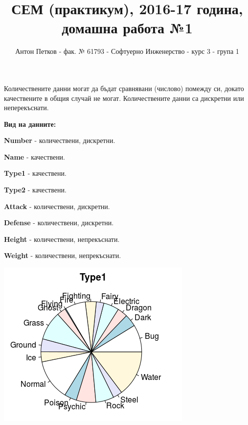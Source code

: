 \documentclass[11pt]{article}
\title{СЕМ (практикум), 2016-17 година, домашна работа №1}
\author{Антон Петков - фак. № 61793 - Софтуерно Инженерство - курс 3 - група 1}
\begin{document}
\maketitle

Количествените данни могат да бъдат сравнявани (числово) помежду си, докато качествените в общия случай не могат. Количествените данни са дискретни или неперекъснати.\newline

\textbf{Вид на данните:}

\textbf{Number} - количествени, дискретни.

\textbf{Name} - качествени.

\textbf{Type1} - качествени.

\textbf{Type2} - качествени.

\textbf{Attack} - количествени, дискретни.

\textbf{Defense} - количествени, дискретни.

\textbf{Height} - количествени, непрекъснати.

\textbf{Weight} - количествени, непрекъснати.
\newline

\begin{center}
	\includegraphics[resolution=364]{images/type1pie}
\end{center}
\end{document}
